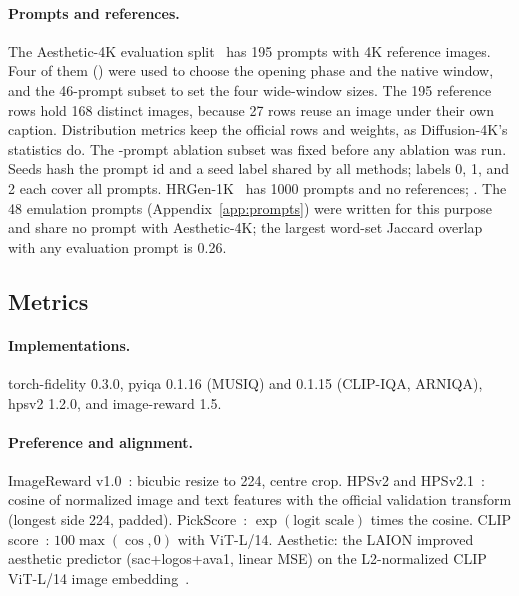 \paragraph{Prompts and references.} The Aesthetic-4K evaluation split~\citep{zhang2025diffusion4k} has 195 prompts with 4K reference images. Four of them (\devprompts) were used to choose the opening phase and the native window, and the 46-prompt subset to set the four wide-window sizes.  The 195 reference rows hold 168 distinct images, because 27 rows reuse an image under their own caption. Distribution metrics keep the official rows and weights, as Diffusion-4K's statistics do. The \nabl-prompt ablation subset was fixed before any ablation was run. Seeds hash the prompt id and a seed label shared by all methods; labels 0, 1, and 2 each cover all \nmain{} prompts. HRGen-1K~\citep{rajabi2026area} has 1000 prompts and no references; . The 48 emulation prompts (Appendix~\ref{app:prompts}) were written for this purpose and share no prompt with Aesthetic-4K; the largest word-set Jaccard overlap with any evaluation prompt is 0.26.

\subsection{Metrics}
\label{app:metricdefs}

\paragraph{Implementations.} torch-fidelity 0.3.0, pyiqa 0.1.16 (MUSIQ) and 0.1.15 (CLIP-IQA, ARNIQA), hpsv2 1.2.0, and image-reward 1.5.

\paragraph{Preference and alignment.} ImageReward v1.0~\citep{xu2023imagereward}: bicubic resize to 224, centre crop. HPSv2 and HPSv2.1~\citep{wu2023hpsv2}: cosine of normalized image and text features with the official validation transform (longest side 224, padded). PickScore~\citep{kirstain2023pickapic}: $\exp(\text{logit scale})$ times the cosine. CLIP score~\citep{radford2021clip}: $100\max(\cos,0)$ with \mbox{ViT-L/14}. Aesthetic: the LAION improved aesthetic predictor (sac+logos+ava1, linear MSE) on the L2-normalized CLIP \mbox{ViT-L/14} image embedding~\citep{schuhmann2022aesthetic}.

